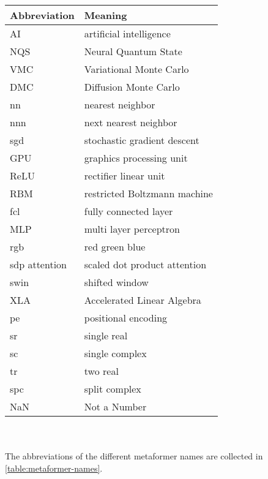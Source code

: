 \noindent\\\\

\begin{tabular}[h]{p{3cm}|l}
	Abbreviation & Meaning\\
	\hline
	AI & artificial intelligence\\ 
	NQS & Neural Quantum State\\
	VMC & Variational Monte Carlo\\
	DMC & Diffusion Monte Carlo\\
	nn & nearest neighbor\\
	nnn & next nearest neighbor\\
	sgd & stochastic gradient descent\\
	GPU & graphics processing unit\\
	ReLU & rectifier linear unit\\
	RBM & restricted Boltzmann machine\\
	fcl & fully connected layer\\
	MLP & multi layer perceptron\\
	rgb & red green blue\\
	sdp attention & scaled dot product attention\\
	swin & shifted window\\
	XLA & Accelerated Linear Algebra\\
	pe & positional encoding\\
	sr & single real\\
	sc & single complex\\
	tr & two real\\
	spc & split complex\\
	NaN & Not a Number \\
\end{tabular}\\\\

The abbreviations of the different metaformer names are collected in \autoref{table:metaformer-names}.

\newpage